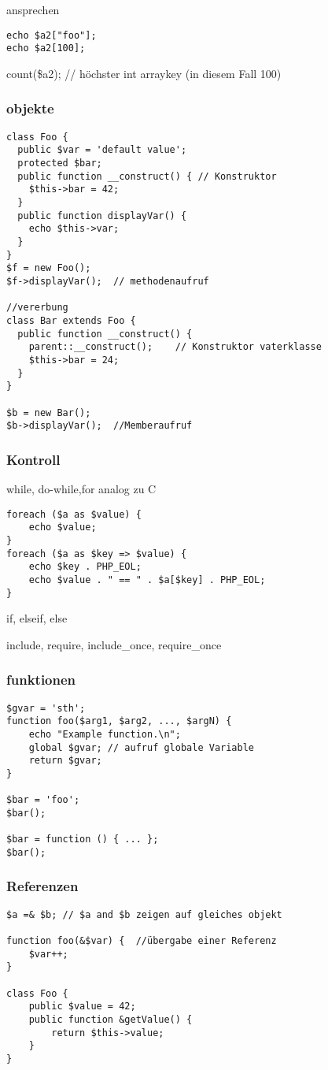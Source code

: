 ansprechen
\begin{verbatim}
echo $a2["foo"];
echo $a2[100];
\end{verbatim}

count(\$a2); // höchster int arraykey (in diesem Fall 100)

\subsubsection*{objekte}
\begin{verbatim}
class Foo {
  public $var = 'default value';
  protected $bar;
  public function __construct() { // Konstruktor
    $this->bar = 42;
  }
  public function displayVar() {
    echo $this->var;
  }
}
$f = new Foo();
$f->displayVar();  // methodenaufruf

//vererbung
class Bar extends Foo {
  public function __construct() {
    parent::__construct();    // Konstruktor vaterklasse
    $this->bar = 24;
  }
}

$b = new Bar();
$b->displayVar();  //Memberaufruf
\end{verbatim}

\subsubsection*{Kontroll}
while, do-while,for analog zu C
\begin{verbatim}
foreach ($a as $value) {
	echo $value;
}
foreach ($a as $key => $value) {
	echo $key . PHP_EOL;
	echo $value . " == " . $a[$key] . PHP_EOL;
}
\end{verbatim}

if, elseif, else

include, require, include\_once, require\_once

\subsubsection*{funktionen}
\begin{verbatim}
$gvar = 'sth';
function foo($arg1, $arg2, ..., $argN) {
	echo "Example function.\n";
	global $gvar; // aufruf globale Variable
	return $gvar;
}

$bar = 'foo';
$bar();

$bar = function () { ... };
$bar();
\end{verbatim}

\subsubsection*{Referenzen}
\begin{verbatim}
$a =& $b; // $a and $b zeigen auf gleiches objekt

function foo(&$var) {  //übergabe einer Referenz
	$var++;
}

class Foo {
	public $value = 42;
	public function &getValue() {
		return $this->value;
	}
}
\end{verbatim}

